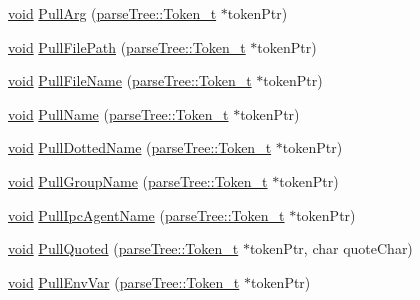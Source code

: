 \begin{DoxyCompactItemize}
\item 
\hyperlink{_t_e_m_p_l_a_t_e__cdef_8h_ac9c84fa68bbad002983e35ce3663c686}{void} \hyperlink{classparser_1_1_lexer__t_ab6b0baeee2ac09b41527719eb7a3c31c}{Pull\+Arg} (\hyperlink{structparse_tree_1_1_token__t}{parse\+Tree\+::\+Token\+\_\+t} $\ast$token\+Ptr)
\item 
\hyperlink{_t_e_m_p_l_a_t_e__cdef_8h_ac9c84fa68bbad002983e35ce3663c686}{void} \hyperlink{classparser_1_1_lexer__t_aef844d744f2568fe03579f44c680f5cc}{Pull\+File\+Path} (\hyperlink{structparse_tree_1_1_token__t}{parse\+Tree\+::\+Token\+\_\+t} $\ast$token\+Ptr)
\item 
\hyperlink{_t_e_m_p_l_a_t_e__cdef_8h_ac9c84fa68bbad002983e35ce3663c686}{void} \hyperlink{classparser_1_1_lexer__t_a28b6c868282e0c31aeae91d67d9308b3}{Pull\+File\+Name} (\hyperlink{structparse_tree_1_1_token__t}{parse\+Tree\+::\+Token\+\_\+t} $\ast$token\+Ptr)
\item 
\hyperlink{_t_e_m_p_l_a_t_e__cdef_8h_ac9c84fa68bbad002983e35ce3663c686}{void} \hyperlink{classparser_1_1_lexer__t_a83ac5912deb23251183ba25d333d8573}{Pull\+Name} (\hyperlink{structparse_tree_1_1_token__t}{parse\+Tree\+::\+Token\+\_\+t} $\ast$token\+Ptr)
\item 
\hyperlink{_t_e_m_p_l_a_t_e__cdef_8h_ac9c84fa68bbad002983e35ce3663c686}{void} \hyperlink{classparser_1_1_lexer__t_a70ecad48f80faca7d7c9ef2a17bd15a5}{Pull\+Dotted\+Name} (\hyperlink{structparse_tree_1_1_token__t}{parse\+Tree\+::\+Token\+\_\+t} $\ast$token\+Ptr)
\item 
\hyperlink{_t_e_m_p_l_a_t_e__cdef_8h_ac9c84fa68bbad002983e35ce3663c686}{void} \hyperlink{classparser_1_1_lexer__t_aced857ba012be93e34e7b646fce7187b}{Pull\+Group\+Name} (\hyperlink{structparse_tree_1_1_token__t}{parse\+Tree\+::\+Token\+\_\+t} $\ast$token\+Ptr)
\item 
\hyperlink{_t_e_m_p_l_a_t_e__cdef_8h_ac9c84fa68bbad002983e35ce3663c686}{void} \hyperlink{classparser_1_1_lexer__t_abde46bf45d6eba42f3b160d69afd0993}{Pull\+Ipc\+Agent\+Name} (\hyperlink{structparse_tree_1_1_token__t}{parse\+Tree\+::\+Token\+\_\+t} $\ast$token\+Ptr)
\item 
\hyperlink{_t_e_m_p_l_a_t_e__cdef_8h_ac9c84fa68bbad002983e35ce3663c686}{void} \hyperlink{classparser_1_1_lexer__t_a2b4297ec19cdf9b4d11fee727c026af2}{Pull\+Quoted} (\hyperlink{structparse_tree_1_1_token__t}{parse\+Tree\+::\+Token\+\_\+t} $\ast$token\+Ptr, char quote\+Char)
\item 
\hyperlink{_t_e_m_p_l_a_t_e__cdef_8h_ac9c84fa68bbad002983e35ce3663c686}{void} \hyperlink{classparser_1_1_lexer__t_a8449d6b2d79f6bc37b59306c238eeb99}{Pull\+Env\+Var} (\hyperlink{structparse_tree_1_1_token__t}{parse\+Tree\+::\+Token\+\_\+t} $\ast$token\+Ptr)

\end{DoxyCompactItemize}
